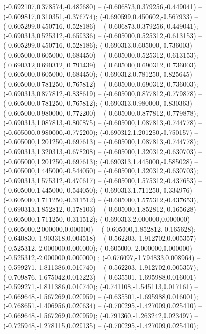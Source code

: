  (-0.692107,0.378574,-0.482680) -- (-0.606873,0.379256,-0.449041) -- (-0.609817,0.310351,-0.376774);
 (-0.690599,0.450602,-0.567933) -- (-0.605299,0.450716,-0.528186) -- (-0.606873,0.379256,-0.449041);
 (-0.690313,0.525312,-0.659336) -- (-0.605000,0.525312,-0.613153) -- (-0.605299,0.450716,-0.528186);
 (-0.690313,0.605000,-0.736003) -- (-0.605000,0.605000,-0.684450) -- (-0.605000,0.525312,-0.613153);
 (-0.690312,0.690312,-0.791439) -- (-0.605000,0.690312,-0.736003) -- (-0.605000,0.605000,-0.684450);
 (-0.690312,0.781250,-0.825645) -- (-0.605000,0.781250,-0.767812) -- (-0.605000,0.690312,-0.736003);
 (-0.690313,0.877812,-0.838619) -- (-0.605000,0.877812,-0.779878) -- (-0.605000,0.781250,-0.767812);
 (-0.690313,0.980000,-0.830363) -- (-0.605000,0.980000,-0.772200) -- (-0.605000,0.877812,-0.779878);
 (-0.690313,1.087813,-0.800875) -- (-0.605000,1.087813,-0.744778) -- (-0.605000,0.980000,-0.772200);
 (-0.690312,1.201250,-0.750157) -- (-0.605000,1.201250,-0.697613) -- (-0.605000,1.087813,-0.744778);
 (-0.690313,1.320313,-0.678208) -- (-0.605000,1.320312,-0.630703) -- (-0.605000,1.201250,-0.697613);
 (-0.690313,1.445000,-0.585028) -- (-0.605000,1.445000,-0.544050) -- (-0.605000,1.320312,-0.630703);
 (-0.690313,1.575312,-0.470617) -- (-0.605000,1.575312,-0.437653) -- (-0.605000,1.445000,-0.544050);
 (-0.690313,1.711250,-0.334976) -- (-0.605000,1.711250,-0.311512) -- (-0.605000,1.575312,-0.437653);
 (-0.690313,1.852812,-0.178103) -- (-0.605000,1.852812,-0.165628) -- (-0.605000,1.711250,-0.311512);
 (-0.690313,2.000000,0.000000) -- (-0.605000,2.000000,0.000000) -- (-0.605000,1.852812,-0.165628);
 (-0.640830,-1.903318,0.004518) -- (-0.562203,-1.912702,0.005357) -- (-0.525312,-2.000000,0.000000);
 (-0.605000,-2.000000,0.000000) -- (-0.525312,-2.000000,0.000000) ;
 (-0.676097,-1.794833,0.008964) -- (-0.599271,-1.811386,0.010740) -- (-0.562203,-1.912702,0.005357);
 (-0.709876,-1.675042,0.013223) -- (-0.635501,-1.695988,0.016001) -- (-0.599271,-1.811386,0.010740);
 (-0.741108,-1.545113,0.017161) -- (-0.669648,-1.567269,0.020959) -- (-0.635501,-1.695988,0.016001);
 (-0.768651,-1.406956,0.020634) -- (-0.700295,-1.427009,0.025410) -- (-0.669648,-1.567269,0.020959);
 (-0.791360,-1.263242,0.023497) -- (-0.725948,-1.278115,0.029135) -- (-0.700295,-1.427009,0.025410);
